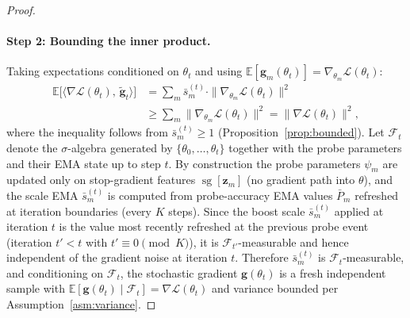 \documentclass{article} %
\newcommand{\loss}{\mathcal{L}}
\newcommand{\sg}{\operatorname{sg}}
\begin{document}
\begin{proof}
\paragraph{Step 2: Bounding the inner product.}
Taking expectations conditioned on $\theta_t$ and using $\mathbb{E}[\mathbf{g}_m(\theta_t)] = \nabla_{\theta_m} \loss(\theta_t)$:
%
\begin{align}
\mathbb{E}\bigl[\langle \nabla \loss(\theta_t),\, \tilde{\mathbf{g}}_t \rangle\bigr]
&= \sum_m \bar{s}_m^{(t)} \cdot \|\nabla_{\theta_m} \loss(\theta_t)\|^2 \nonumber \\
&\geq \sum_m \|\nabla_{\theta_m} \loss(\theta_t)\|^2 = \|\nabla \loss(\theta_t)\|^2,
\label{eq:inner_bound}
\end{align}
%
where the inequality follows from $\bar{s}_m^{(t)} \geq 1$ (Proposition~\ref{prop:bounded}). Let $\mathcal{F}_t$ denote the $\sigma$-algebra generated by $\{\theta_0, \dots, \theta_t\}$ together with the probe parameters and their EMA state up to step $t$. By construction the probe parameters $\psi_m$ are updated only on stop-gradient features $\sg[\mathbf{z}_m]$ (no gradient path into $\theta$), and the scale EMA $\bar{s}_m^{(t)}$ is computed from probe-accuracy EMA values $\bar{P}_m$ refreshed at iteration boundaries (every $K$ steps). Since the boost scale $\bar{s}_m^{(t)}$ applied at iteration $t$ is the value most recently refreshed at the previous probe event (iteration $t' < t$ with $t' \equiv 0 \pmod K$), it is $\mathcal{F}_{t'}$-measurable and hence independent of the gradient noise at iteration $t$. Therefore $\bar{s}_m^{(t)}$ is $\mathcal{F}_t$-measurable, and conditioning on $\mathcal{F}_t$, the stochastic gradient $\mathbf{g}(\theta_t)$ is a fresh independent sample with $\mathbb{E}[\mathbf{g}(\theta_t) \mid \mathcal{F}_t] = \nabla\loss(\theta_t)$ and variance bounded per Assumption~\ref{asm:variance}.


\end{proof}
\end{document}
